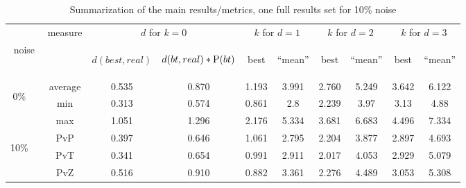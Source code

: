 \begin{table}[h]
\caption{Summarization of the main results/metrics, one full results set for 10\% noise}
\begin{center}
\begin{footnotesize}
\begin{tabular}{|c|c|cc|cc|cc|cc|}
\hline
  & measure & \multicolumn{2}{|c|}{$d$ for $k=0$} & \multicolumn{2}{|c|}{$k$ for $d=1$} & \multicolumn{2}{|c|}{$k$ for $d=2$} & \multicolumn{2}{|c|}{$k$ for $d=3$} \\
 noise & & \begin{scriptsize}$d(best,real)$\end{scriptsize} 
& \begin{scriptsize}$d(bt,real)*\mathrm{P}(bt)$\end{scriptsize}
& \begin{scriptsize}best\end{scriptsize}
& \begin{scriptsize}``mean''\end{scriptsize}
& \begin{scriptsize}best\end{scriptsize}
& \begin{scriptsize}``mean''\end{scriptsize}
& \begin{scriptsize}best\end{scriptsize}
&  \begin{scriptsize}``mean''\end{scriptsize} \\
\hline
\multirow{3}{3mm}{\begin{sideways}\parbox{3mm}{0\%\ \ }\end{sideways}}
& average & 0.535 & 0.870 & 1.193 & 3.991 & 2.760 & 5.249 & 3.642 & 6.122\\
& min & 0.313 & 0.574 & 0.861 & 2.8 & 2.239 & 3.97 & 3.13 & 4.88\\
& max & 1.051 & 1.296 & 2.176 & 5.334 & 3.681 & 6.683 & 4.496 & 7.334\\
\hline
\multirow{3}{3mm}{\begin{sideways}\parbox{3mm}{10\%\ \ }\end{sideways}}
 & PvP & 0.397 & 0.646 & 1.061 & 2.795 & 2.204 & 3.877 & 2.897 & 4.693\\
 & PvT & 0.341 & 0.654 & 0.991 & 2.911 & 2.017 & 4.053 & 2.929 & 5.079\\
 & PvZ & 0.516 & 0.910 & 0.882 & 3.361 & 2.276 & 4.489 & 3.053 & 5.308\\

\end{tabular}
\end{footnotesize}
\end{center}
\end{table}
